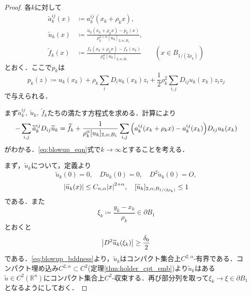 \documentclass[a4paper]{ltjsarticle}
\newcommand{\Rset}{\mathbb{R}}
\newcommand{\1}{\mathbbm{1}}
\numberwithin{equation}{section}
\theoremstyle{definition}
\begin{document}
\begin{proof}
    各$k$に対して
    \begin{align}
        \widetilde{a}^{ij}_k (x)&\coloneqq a^{ij}_k(x_k+\rho_kx),\\
        \widetilde{u}_k(x)&\coloneqq \frac{u_k(x_k+\rho_kx)-p_k(x)}{\rho_k^{2+\alpha}[u_k]_{2,\alpha;B_{1}}},\\
        \widetilde{f}_k(x)&\coloneqq \frac{f_k(x_k+\rho_kx)-f_k(x_k)}{\rho_k^{\alpha}[u_k]_{2,\alpha;B_{1}}}\quad\quad (x\in B_{1/(2\rho_k)})
    \end{align}
    とおく．ここで$p_k$は
    \begin{equation}
        p_k(z)\coloneqq u_k(x_k)+\rho_k\sum_{i}D_iu_k(x_k)z_i+\frac{1}{2}\rho_k^2\sum_{i,j}D_{ij}u_k(x_k)z_iz_j 
    \end{equation}
    で与えられる．

    まず$\widetilde{a}^{ij}_k,\ \widetilde{u}_k,\ \widetilde{f}_k$たちの満たす方程式を求める．計算により
    \begin{align}
        -\sum_{i,j}\widetilde{a}^{ij}_k D_{ij}\widetilde{u}_k=\widetilde{f}_k+\frac{1}{\rho_k^\alpha [u_k]_{2,\alpha;B_1}}\sum_{i,j}\qty(a^{ij}_k(x_k+\rho_kx)-a^{ij}_k(x_k))D_{ij}u_k(x_k)\label{eq:blowup_eqn}
    \end{align}
    がわかる．\eqref{eq:blowup_eqn}式で$k\to\infty$とすることを考える．

    まず，$\widetilde{u}_k$について，定義より
    \begin{equation}
        \widetilde{u}_k(0)=0,\quad D\widetilde{u}_k(0)=0,\quad D^2 \widetilde{u}_k(0)=O,\label{eq:blowup_evaluation_at_0}
    \end{equation}
    \begin{equation}
        |\widetilde{u}_{k}(x)|\leq C_{n,\alpha} \abs{x}^{2+\alpha},\quad [\widetilde{u}_k]_{2,\alpha;B_{1/(2\rho_k)}}\leq 1 \label{eq:blowup_bddness}
    \end{equation}
    である．また
    \begin{equation}
        \xi_k\coloneqq \frac{y_k-x_k}{\rho_k}\in \partial B_1 
    \end{equation}
    とおくと
    \begin{equation}
        \abs{D^2\widetilde{u}_k(\xi_k)}\geq \frac{\delta_0}{2}\label{eq:blowup_evaluation_at_xi}
    \end{equation}
    である．\eqref{eq:blowup_bddness}より，$\widetilde{u}_k$はコンパクト集合上$C^{2,\alpha}$-有界である．コンパクト埋め込み$C^{2,\alpha}\subset C^2$(定理\ref{thm:holder_cpt_emb})より$\widetilde{u}_k$はある$\widetilde{u}\in C^{2}(\Rset^n)$にコンパクト集合上$C^2$-収束する．再び部分列を取って$\xi_k\to \xi\in \partial B_{1}$となるようにしておく．


\end{proof}
\end{document}
